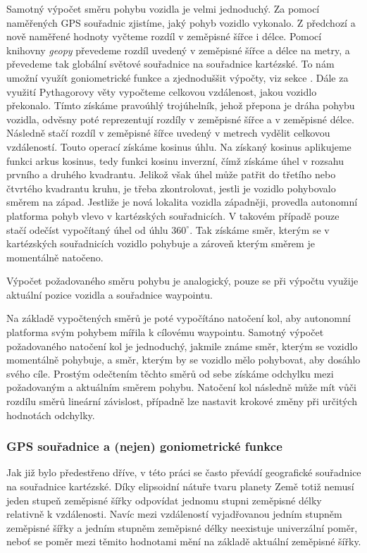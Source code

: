 \documentclass[czech,bachelor,dept460,male,cpp,cpdeclaration]{diploma}
\begin{document}
Samotný výpočet směru pohybu vozidla je velmi jednoduchý. Za pomocí naměřených GPS souřadnic zjistíme, jaký pohyb vozidlo 
vykonalo. Z předchozí a nově naměřené hodnoty vyčteme rozdíl v zeměpisné šířce i délce. Pomocí knihovny \emph{geopy} převedeme 
rozdíl uvedený v zeměpisné šířce a délce na metry, a převedeme tak globální světové souřadnice na souřadnice kartézské. To nám 
umožní využít goniometrické funkce a zjednoduššit výpočty, viz sekce . Dále za využití Pythagorovy 
věty vypočteme celkovou vzdálenost, jakou vozidlo překonalo. Tímto získáme pravoúhlý trojúhelník, jehož přepona je dráha
pohybu vozidla, odvěsny poté reprezentují rozdíly v zeměpisné šířce a v zeměpisné délce. Následně stačí rozdíl v zeměpisné šířce
uvedený v metrech vydělit celkovou vzdáleností. Touto operací získáme kosinus úhlu. Na získaný kosinus aplikujeme funkci arkus
kosinus, tedy funkci kosinu inverzní, čímž získáme úhel v rozsahu prvního a druhého kvadrantu. Jelikož však úhel může patřit do
třetího nebo čtvrtého kvadrantu kruhu, je třeba zkontrolovat, jestli je vozidlo pohybovalo směrem na západ. Jestliže je nová 
lokalita vozidla západněji, provedla autonomní platforma pohyb vlevo v kartézských souřadnicích. V takovém případě pouze stačí
odečíst vypočítaný úhel od úhlu $360^{\circ}$. Tak získáme směr, kterým se v kartézských souřadnicích vozidlo pohybuje a zároveň
kterým směrem je momentálně natočeno.

Výpočet požadovaného směru pohybu je analogický, pouze se při výpočtu využije aktuální pozice vozidla a souřadnice waypointu. 

Na základě vypočtených směrů je poté vypočítáno natočení kol, aby autonomní platforma svým pohybem mířila k cílovému waypointu. 
Samotný výpočet požadovaného natočení kol je jednoduchý, jakmile známe směr, kterým se vozidlo momentálně pohybuje, a směr, kterým
by se vozidlo mělo pohybovat, aby dosáhlo svého cíle. Prostým odečtením těchto směrů od sebe získáme odchylku mezi požadovaným 
a aktuálním směrem pohybu. Natočení kol následně může mít vůči rozdílu směrů lineární závislost, případně lze nastavit krokové 
změny při určitých hodnotách odchylky.

\subsubsection{GPS souřadnice a (nejen) goniometrické funkce} \label{cartesian-coordinates}

Jak již bylo předestřeno dříve, v této práci se často převádí geografické souřadnice na souřadnice kartézské. Díky elipsoidní 
nátuře tvaru planety Země totiž nemusí jeden stupeň zeměpisné šířky odpovídat jednomu stupni zeměpisné délky relativně 
k vzdálenosti. Navíc mezi vzdáleností vyjadřovanou jedním stupněm zeměpisné šířky a jedním stupněm zeměpisné délky neexistuje
univerzální poměr, neboť se poměr mezi těmito hodnotami mění na základě aktuální zeměpisné šířky.
\end{document}
